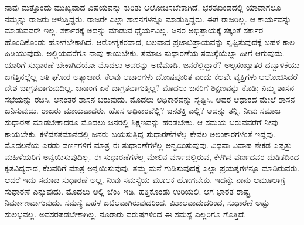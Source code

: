 \vskip   4pt

ನಾವು ಮತ್ತೊಂದು ಮುಖ್ಯವಾದ ವಿಷಯವನ್ನು ಕುರಿತು ಆಲೋಚಿಸಬೇಕಾಗಿದೆ. ಭರತಖಂಡದಲ್ಲಿ ಯಾವಾಗಲೂ ನಮ್ಮನ್ನು ರಾಜರು ಆಳುತ್ತಿದ್ದರು. ರಾಜರೇ ಎಲ್ಲಾ ಶಾಸನಗಳನ್ನೂ ಮಾಡುತ್ತಿದ್ದರು. ಈಗ ರಾಜರಿಲ್ಲ. ಆ ಕಾರ್ಯವನ್ನು ಮಾಡುವವರೇ ಇಲ್ಲ. ಸರ್ಕಾರಕ್ಕೆ ಅದನ್ನು ಮಾಡುವ ಧೈರ್ಯವಿಲ್ಲ. ಜನರ ಅಭಿಪ್ರಾಯಕ್ಕೆ ತಕ್ಕಂತೆ ಸರ್ಕಾರ ಹೊಂದಿಕೊಂಡು ಹೋಗಬೇಕಾಗಿದೆ. ಆರೋಗ್ಯಕರವಾದ, ಬಲವಾದ ಪ್ರಜಾಭಿಪ್ರಾಯವನ್ನು ಸೃಷ್ಟಿಸುವುದಕ್ಕೆ ಬಹಳ ಕಾಲ ಹಿಡಿಯುವುದು. ಅಲ್ಲಿಯವರೆಗೂ ನಾವು ಕಾಯಬೇಕು. ಸಮಾಜ ಸುಧಾರಣೆಯ ಸಮಸ್ಯೆಯೆಲ್ಲಾ ಹೀಗೆ ಆಗುವುದು. ಯಾರಿಗೆ ಸುಧಾರಣೆ ಬೇಕಾಗಿದೆಯೋ ಮೊದಲು ಅವರನ್ನು ಅಣಿಮಾಡಿ. ಜನರೆಲ್ಲಿದ್ದಾರೆ? ಅಲ್ಪಸಂಖ್ಯಾತರ ದಬ್ಬಾಳಿಕೆಯು ಜಗತ್ತಿನಲ್ಲೆಲ್ಲ ಅತಿ ಘೋರ ಅತ್ಯಾಚಾರ. ಕೆಲವು ಆಚಾರಗಳು ದೋಷಪೂರಿತ ಎಂದು ಕೆಲವೇ ವ್ಯಕ್ತಿಗಳು ಆಲೋಚಿಸಿದರೆ ದೇಶ ಜಾಗ್ರತವಾಗುವುದಿಲ್ಲ. ಜನಾಂಗ ಏಕೆ ಜಾಗ್ರತವಾಗುತ್ತಿಲ್ಲ? ಮೊದಲು ಜನರಿಗೆ ಶಿಕ್ಷಣವನ್ನು ಕೊಡಿ; ನಿಮ್ಮ ಶಾಸನ ಸಭೆಯನ್ನು ರಚಿಸಿ. ಅನಂತರ ಶಾಸನ ಬರುವುದು. ಮೊದಲು ಅಧಿಕಾರವನ್ನು ಸೃಷ್ಟಿಸಿ. ಅದರ ಆಧಾರದ ಮೇಲೆ ಶಾಸನ ಜನಿಸುವುದು. ರಾಜರು ಮಾಯವಾದರು. ಹೊಸ ಅಧಿಕಾರವೆಲ್ಲಿ? ಜನಶಕ್ತಿ ಎಲ್ಲಿ? ಅದನ್ನು ತನ್ನಿ. ನೀವು ಸಮಾಜ ಸುಧಾರಣೆ ಮಾಡಬೇಕಾದರೂ ಮೊದಲು ಜನರಲ್ಲಿ ಶಿಕ್ಷಣವನ್ನು ಹರಡಬೇಕು. ಆ ಸಮಯ ಬರುವವರೆಗೆ ನೀವು ಕಾಯಬೇಕು. ಕಳೆದ\break ಶತಮಾನದಲ್ಲಿ ಜನರು ಬಯಸುತ್ತಿದ್ದ ಸುಧಾರಣೆಗಳೆಲ್ಲ ಕೇವಲ ಅಲಂಕಾರಗಳಂತೆ ಇದ್ದವು. ಮೊದಲನೆಯ ಎರಡು ವರ್ಣಗಳಿಗೆ ಮಾತ್ರ ಈ ಸುಧಾರಣೆಗಳೆಲ್ಲ ಅನ್ವಯಿಸುವುವು. ವಿಧವಾ ವಿವಾಹ ಶೇಕಡ ಎಪ್ಪತ್ತು ಮಹಿಳೆಯರಿಗೆ ಅನ್ವಯಿಸುವುದಿಲ್ಲ. ಈ ಸುಧಾರಣೆಗಳೆಲ್ಲ ಮೇಲಿನ ವರ್ಣದಲ್ಲಿರುವ, ಕೆಳಗಿನ ವರ್ಣದವರ ದುಡಿತದಿಂದ ಕೃತವಿದ್ಯರಾದ, ಕೆಲವರಿಗೆ ಮಾತ್ರ ಅನ್ವಯಿಸುವುವು. ತಮ್ಮ ಮನೆ ಗುಡಿಸುವುದಕ್ಕೆ ಎಲ್ಲಾ ಪ್ರಯತ್ನಗಳನ್ನೂ ಮಾಡಿರುವರು. ಆದರೆ ಇದು ಸಮಾಜ ಸುಧಾರಣೆ ಅಲ್ಲ. ನೀವು ಸಮಸ್ಯೆಯ ಮೂಲಕ ಹೋಗಬೇಕು. ಇದನ್ನೇ ನಾನು ಆಮೂಲಾಗ್ರ ಸುಧಾರಣೆ ಎನ್ನುವುದು. ಮೊದಲು ಅಲ್ಲಿ ಬೆಂಕಿ ಇಡಿ, ಹತ್ತಿಕೊಂಡು ಉರಿಯಲಿ. ಆಗ ಭಾರತ ರಾಷ್ಟ್ರ ನಿರ್ಮಾಣವಾಗುವುದು. ಸಮಸ್ಯೆ ಬಹಳ ಜಟಿಲವಾಗಿರುವುದರಿಂದ, ವಿಶಾಲವಾದುದರಿಂದ, ಸುಧಾರಣೆ ಅಷ್ಟು ಸುಲಭವಲ್ಲ. ಅವಸರಪಡಬೇಕಾಗಿಲ್ಲ. ನೂರಾರು ವರುಷಗಳಿಂದ ಈ ಸಮಸ್ಯೆ ಎಲ್ಲರಿಗೂ ಗೊತ್ತಿದೆ.

\vskip   4pt

